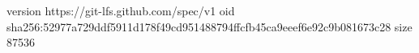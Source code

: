 version https://git-lfs.github.com/spec/v1
oid sha256:52977a729ddf5911d178f49cd951488794ffcfb45ca9eeef6e92c9b081673c28
size 87536
